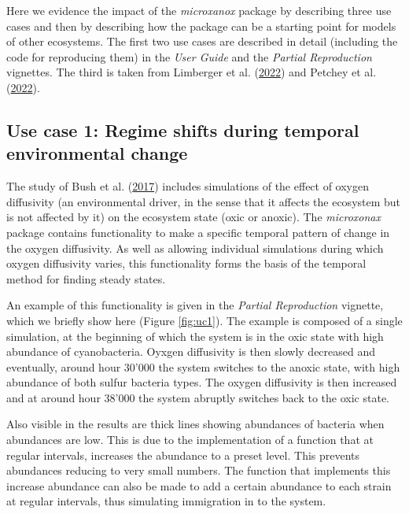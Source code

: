 \documentclass[
]{article}
\begin{document}
Here we evidence the impact of the \emph{microxanox} package by
describing three use cases and then by describing how the package can be
a starting point for models of other ecosystems. The first two use cases
are described in detail (including the code for reproducing them) in the
\emph{User Guide} and the \emph{Partial Reproduction} vignettes. The
third is taken from Limberger et al.
(\protect\hyperlink{ref-Limberger2022}{2022}) and Petchey et al.
(\protect\hyperlink{ref-Petchey2022}{2022}).

\hypertarget{use-case-1-regime-shifts-during-temporal-environmental-change}{%
\subsection{Use case 1: Regime shifts during temporal environmental
change}\label{use-case-1-regime-shifts-during-temporal-environmental-change}}

The study of Bush et al. (\protect\hyperlink{ref-Bush2017}{2017})
includes simulations of the effect of oxygen diffusivity (an
environmental driver, in the sense that it affects the ecosystem but is
not affected by it) on the ecosystem state (oxic or anoxic). The
\emph{microxonax} package contains functionality to make a specific
temporal pattern of change in the oxygen diffusivity. As well as
allowing individual simulations during which oxygen diffusivity varies,
this functionality forms the basis of the temporal method for finding
steady states.

An example of this functionality is given in the \emph{Partial
Reproduction} vignette, which we briefly show here (Figure
\ref{fig:uc1}). The example is composed of a single simulation, at the
beginning of which the system is in the oxic state with high abundance
of cyanobacteria. Oyxgen diffusivity is then slowly decreased and
eventually, around hour 30'000 the system switches to the anoxic state,
with high abundance of both sulfur bacteria types. The oxygen
diffusivity is then increased and at around hour 38'000 the system
abruptly switches back to the oxic state.

Also visible in the results are thick lines showing abundances of
bacteria when abundances are low. This is due to the implementation of a
function that at regular intervals, increases the abundance to a preset
level. This prevents abundances reducing to very small numbers. The
function that implements this increase abundance can also be made to add
a certain abundance to each strain at regular intervals, thus simulating
immigration in to the system.
\end{document}
